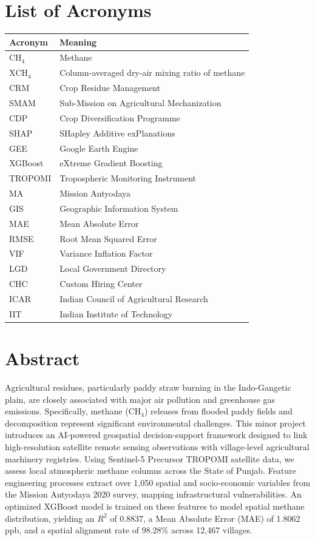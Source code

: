 \documentclass[12pt,a4paper]{report}
\begin{document}
\chapter*{List of Acronyms}
\begin{longtable}{ll}
\toprule
\textbf{Acronym} & \textbf{Meaning} \\
\midrule
$\text{CH}_4$ & Methane \\
$\text{XCH}_4$ & Column-averaged dry-air mixing ratio of methane \\
CRM & Crop Residue Management \\
SMAM & Sub-Mission on Agricultural Mechanization \\
CDP & Crop Diversification Programme \\
SHAP & SHapley Additive exPlanations \\
GEE & Google Earth Engine \\
XGBoost & eXtreme Gradient Boosting \\
TROPOMI & Tropospheric Monitoring Instrument \\
MA & Mission Antyodaya \\
GIS & Geographic Information System \\
MAE & Mean Absolute Error \\
RMSE & Root Mean Squared Error \\
VIF & Variance Inflation Factor \\
LGD & Local Government Directory \\
CHC & Custom Hiring Center \\
ICAR & Indian Council of Agricultural Research \\
IIT & Indian Institute of Technology \\
\bottomrule
\end{longtable}

\chapter*{Abstract}
Agricultural residues, particularly paddy straw burning in the Indo-Gangetic plain, are closely associated with major air pollution and greenhouse gas emissions. Specifically, methane ($\text{CH}_4$) releases from flooded paddy fields and decomposition represent significant environmental challenges. This minor project introduces an AI-powered geospatial decision-support framework designed to link high-resolution satellite remote sensing observations with village-level agricultural machinery registries. Using Sentinel-5 Precursor TROPOMI satellite data, we assess local atmospheric methane columns across the State of Punjab. Feature engineering processes extract over 1,050 spatial and socio-economic variables from the Mission Antyodaya 2020 survey, mapping infrastructural vulnerabilities. An optimized XGBoost model is trained on these features to model spatial methane distribution, yielding an $R^2$ of 0.8837, a Mean Absolute Error (MAE) of 1.8062 ppb, and a spatial alignment rate of 98.28\% across 12,467 villages. 
\end{document}
